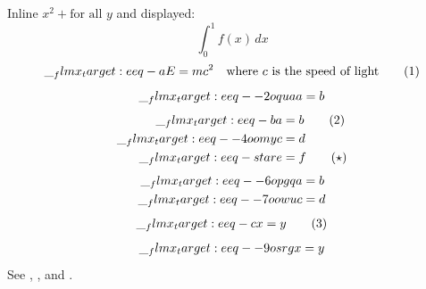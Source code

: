 \documentclass{article}
\begin{document}

Inline \(x^2 + \text{for all } y\) and displayed:
\[ \int_0^1 f(x)\,dx \]
\begin{equation*}\__flmx_target:e {eq-a}
E = mc^2 \quad \text{where \(c\) is the speed of light}
\tag*{(1)}\end{equation*}
\begin{equation*}\__flmx_target:e {eq--2oqua}
a = b
\end{equation*}
\begin{align*}\__flmx_target:e {eq-b}
a &= b  \tag*{(2)}\\\__flmx_target:e {eq--4oomy}
c &= d \\\__flmx_target:e {eq-star}
e &= f\tag*{(\(\star\))}
\end{align*}
\begin{align*}\__flmx_target:e {eq--6opgq}
a &= b \\\__flmx_target:e {eq--7oowu}
c &= d
\end{align*}
\begin{gather*}\__flmx_target:e {eq-c}
x = y\tag*{(3)}
\end{gather*}
\begin{gather*}\__flmx_target:e {eq--9osrg}
x = y
\end{gather*}
See , ,
\flmxLink[kind=ref, href={\#eq-star}, target=eq-star]{\(\star\)} and .
\end{document}
